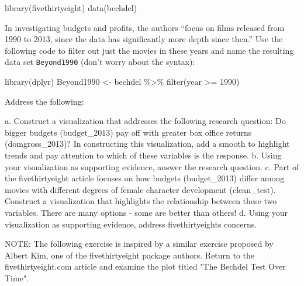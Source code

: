 \documentclass[
  letterpaper,
  DIV=11,
  numbers=noendperiod]{scrreprt}
\newenvironment{Shaded}{\begin{snugshade}}{\end{snugshade}}
\newcommand{\DecValTok}[1]{\textcolor[rgb]{0.68,0.00,0.00}{#1}}
\newcommand{\FunctionTok}[1]{\textcolor[rgb]{0.28,0.35,0.67}{#1}}
\newcommand{\NormalTok}[1]{\textcolor[rgb]{0.00,0.23,0.31}{#1}}
\newcommand{\OtherTok}[1]{\textcolor[rgb]{0.00,0.23,0.31}{#1}}
\newcommand{\SpecialCharTok}[1]{\textcolor[rgb]{0.37,0.37,0.37}{#1}}
\begin{document}
\begin{Shaded}
\begin{Highlighting}[]
\FunctionTok{library}\NormalTok{(fivethirtyeight)}
\FunctionTok{data}\NormalTok{(bechdel)}
\end{Highlighting}
\end{Shaded}

In investigating budgets and profits, the authors ``focus on films
released from 1990 to 2013, since the data has significantly more depth
since then.'' Use the following code to filter out just the movies in
these years and name the resulting data set \texttt{Beyond1990} (don't
worry about the syntax):

\begin{Shaded}
\begin{Highlighting}[]
\FunctionTok{library}\NormalTok{(dplyr)}
\NormalTok{Beyond1990 }\OtherTok{\textless{}{-}}\NormalTok{ bechdel }\SpecialCharTok{\%\textgreater{}\%}
  \FunctionTok{filter}\NormalTok{(year }\SpecialCharTok{\textgreater{}=} \DecValTok{1990}\NormalTok{)}
\end{Highlighting}
\end{Shaded}

\begin{Shaded}
\begin{Highlighting}[]
\NormalTok{Address the following:}
  
\NormalTok{a. Construct a visualization that addresses the following research question: Do bigger budgets (\textasciigrave{}budget\_2013\textasciigrave{}) pay off with greater box office returns (\textasciigrave{}domgross\_2013\textasciigrave{})?  In constructing this visualization, add a smooth to highlight trends and pay attention to which of these variables is the response.       }
\NormalTok{b. Using your visualization as supporting evidence, answer the research question.          }
\NormalTok{c. Part of the fivethirtyeight article focuses on how budgets (\textasciigrave{}budget\_2013\textasciigrave{}) differ among movies with different degrees of female character development (\textasciigrave{}clean\_test\textasciigrave{}).  Construct a visualization that highlights the relationship between these two variables.  There are many options {-} some are better than others!       }
\NormalTok{d. Using your visualization as supporting evidence, address fivethirtyeight\textquotesingle{}s concerns.  }
\end{Highlighting}
\end{Shaded}

\begin{Shaded}
\begin{Highlighting}[]
\NormalTok{NOTE: The following exercise is inspired by a similar exercise proposed by Albert Kim, one of the \textasciigrave{}fivethirtyeight\textasciigrave{} package authors.    }
\NormalTok{    Return to the fivethirtyeight.com article and examine the plot titled "The Bechdel Test Over Time".    }
\end{Highlighting}
\end{Shaded}
\end{document}
